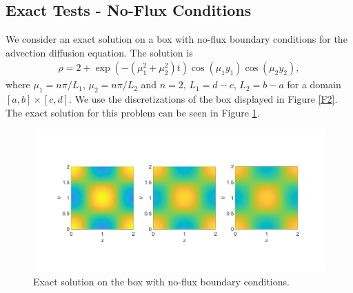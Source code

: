 \documentclass[11pt, a4paper]{article}
\theoremstyle{definition}
\begin{document}
\subsection{Exact Tests - No-Flux Conditions}
We consider an exact solution on a box with no-flux boundary conditions for the advection diffusion equation. The solution is
\begin{align*}
	 \rho = 2 + \exp(-(\mu_1^2 + \mu_2^2)t)\cos(\mu_1 y_1)\cos(\mu_2 y_2),
\end{align*}
where $	\mu_1 = n\pi/L_1$, $\mu_2 = n\pi/L_2$ and $n = 2$, $L_1 = d - c$, $ L_2 = b - a$ for a domain $ [a,b]\times [c,d]$. We use the discretizations of the box displayed in Figure \ref{F2}. The exact solution for this problem can be seen in Figure \ref{F3b}.
\begin{figure}[h]
	\centering
	\includegraphics[scale=0.35]{boxExNoFlux.png}
	\caption{Exact solution on the box with no-flux boundary conditions.} 
	\label{F3b}
\end{figure}
\end{document}

